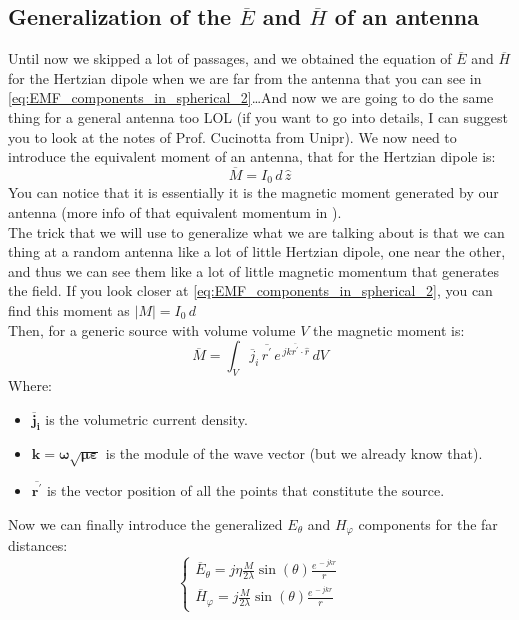 \subsection*{Generalization of the $\overline{E}$ and $\overline{H}$ of an antenna}
Until now we skipped a lot of passages, and we obtained the equation of $\overline{E}$ and $\overline{H}$ for the Hertzian dipole when we are far from the antenna that you can see in \cref{eq:EMF_components_in_spherical_2}\dots And now we are going to do the same thing for a general antenna too LOL (if you want to go into details, I can suggest you to look at the notes of Prof. Cucinotta from Unipr\cite{Appunti_unipr}).
We now need to introduce the equivalent moment of an antenna, that for the Hertzian dipole is:
\begin{equation}
    \overline{M}=I_0 \, d \, \hat{z}
\end{equation}
You can notice that it is essentially it is the magnetic moment generated by our antenna (more info of that equivalent momentum in \cite{Ellingson2020Radiation}).\\
The trick that we will use to generalize what we are talking about is that we can thing at a random antenna like a lot of little Hertzian dipole, one near the other, and thus we can see them like a lot of little magnetic momentum that generates the field. If you look closer at \cref{eq:EMF_components_in_spherical_2}, you can find this moment as $|M|=I_0\,d$\\
Then, for a generic source with volume volume $V$ the magnetic moment is:
\begin{equation}
    \overline{M}=\int_V\overline{j}_i\,\overline{r^\prime}\,e^{\,jk\overline{r^\prime}\cdot \hat{r}}\, dV
\end{equation}
Where:
\begin{itemize}
    \item $\bm{\overline{j}_i}$ is the volumetric current density.
    \item $\bm{k=\omega\sqrt{\mu\varepsilon}}$ is the module of the wave vector (but we already know that).
    \item $\bm{\overline{r^\prime}}$ is the vector position of all the points that constitute the source.
\end{itemize}
Now we can finally introduce the generalized $E_\theta$ and $H_\varphi$ components for the far distances:
\begin{equation}\label{eq:EMF_components_in_spherical_generalized1}
    \begin{cases}
        \overline{E}_\theta = j\eta \frac{M}{2\lambda}\sin(\theta)\frac{e^{\,-jkr}}{r}\\[5pt]
        \overline{H}_\varphi = j\frac{M}{2\lambda}\sin(\theta)\frac{e^{\,-jkr}}{r}
    \end{cases}
\end{equation}
